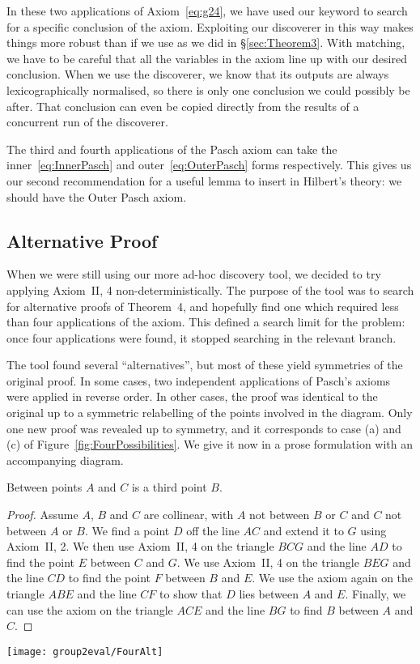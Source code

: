 In these two applications of Axiom~\ref{eq:g24}, we have used our  keyword to search for a specific conclusion of the axiom. Exploiting our discoverer in this way makes things more robust than if we use  as we did in \S\ref{sec:Theorem3}. With matching, we have to be careful that all the variables in the axiom line up with our desired conclusion. When we use the discoverer, we know that its outputs are always lexicographically normalised, so there is only one conclusion we could possibly be after. That conclusion can even be copied directly from the results of a concurrent run of the discoverer.

The third and fourth applications of the Pasch axiom can take the inner~\eqref{eq:InnerPasch} and outer~\eqref{eq:OuterPasch} forms respectively. This gives us our second recommendation for a useful lemma to insert in Hilbert's theory: we should have the Outer Pasch axiom.

\subsection{Alternative Proof}\label{sec:FourAlternative}
When we were still using our more ad-hoc discovery tool, we decided to try applying Axiom~II, 4 non-deterministically. The purpose of the tool was to search for alternative proofs of Theorem~4, and hopefully find one which required less than four applications of the axiom. This defined a search limit for the problem: once four applications were found, it stopped searching in the relevant branch. 

The tool found several ``alternatives'', but most of these yield symmetries of the original proof. In some cases, two independent applications of Pasch's axioms were applied in reverse order. In other cases, the proof was identical to the original up to a symmetric relabelling of the points involved in the diagram. Only one new proof was revealed up to symmetry, and it corresponds to case (a) and (c) of Figure~\ref{fig:FourPossibilities}. We give it now in a prose formulation with an accompanying diagram.

\begin{theorem}
Between points $A$ and $C$ is a third point $B$.
\end{theorem}
\begin{proof}Assume $A$, $B$ and $C$ are collinear, with $A$ not between $B$ or $C$ and $C$ not between $A$ or $B$. We find a point $D$ off the line $AC$ and extend it to $G$ using Axiom~II, 2. We then use Axiom~II, 4 on the triangle $BCG$ and the line $AD$ to find the point $E$ between $C$ and $G$. We use Axiom~II, 4 on the triangle $BEG$ and the line $CD$ to find the point $F$ between $B$ and $E$. We use the axiom again on the triangle $ABE$ and the line $CF$ to show that $D$ lies between $A$ and $E$. Finally, we can use the axiom on the triangle $ACE$ and the line $BG$ to find $B$ between $A$ and $C$.
\end{proof}
\begin{center}\texttt{[image: group2eval/FourAlt]}
\end{center}

